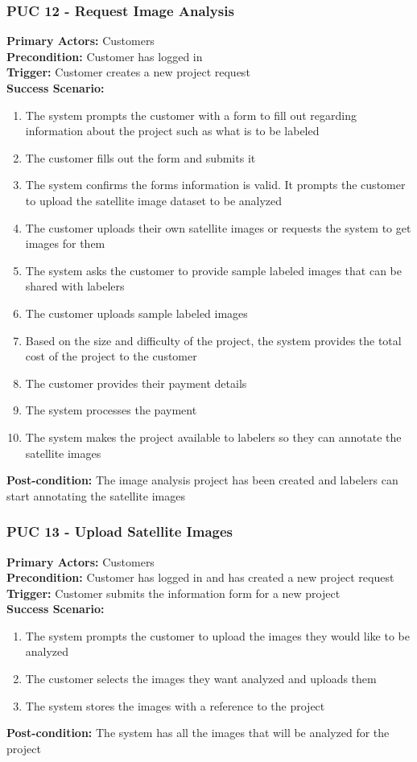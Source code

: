 \documentclass[12pt]{article}
\begin{document}
\subsubsection{PUC 12 - Request Image Analysis}
\textbf{Primary Actors:} Customers\\
\textbf{Precondition:} Customer has logged in\\
\textbf{Trigger:} Customer creates a new project request\\
\textbf{Success Scenario:}
\begin{enumerate}
    \item The system prompts the customer with a form to fill out regarding information about the project such as what is to be labeled
    \item The customer fills out the form and submits it
    \item The system confirms the forms information is valid. It prompts the customer to upload the satellite image dataset to be analyzed
    \item The customer uploads their own satellite images or requests the system to get images for them
    \item The system asks the customer to provide sample labeled images that can be shared with labelers
    \item The customer uploads sample labeled images
    \item Based on the size and difficulty of the project, the system provides the total cost of the project to the customer
    \item The customer provides their payment details
    \item The system processes the payment
    \item The system makes the project available to labelers so they can annotate the satellite images
\end{enumerate}
\textbf{Post-condition:} The image analysis project has been created and labelers can start annotating the satellite images

\subsubsection{PUC 13 - Upload Satellite Images}
\textbf{Primary Actors:} Customers\\
\textbf{Precondition:} Customer has logged in and has created a new project request\\
\textbf{Trigger:} Customer submits the information form for a new project\\
\textbf{Success Scenario:}
\begin{enumerate}
    \item The system prompts the customer to upload the images they would like to be analyzed
    \item The customer selects the images they want analyzed and uploads them
    \item The system stores the images with a reference to the project
\end{enumerate}
\textbf{Post-condition:} The system has all the images that will be analyzed for the project
\end{document}

